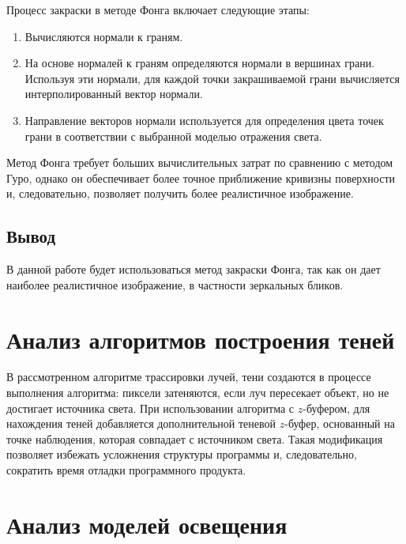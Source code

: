 Процесс закраски в методе Фонга включает следующие этапы:
\begin{enumerate}[label=\arabic*)]
	\item Вычисляются нормали к граням.
	\item На основе нормалей к граням определяются нормали в вершинах грани. Используя эти нормали, для каждой точки закрашиваемой грани вычисляется интерполированный вектор нормали.
	\item Направление векторов нормали используется для определения цвета точек грани в соответствии с выбранной моделью отражения света.
\end{enumerate}

Метод Фонга требует больших вычислительных затрат по сравнению с методом Гуро, однако он обеспечивает более точное приближение кривизны поверхности и, следовательно, позволяет получить более реалистичное изображение.

\subsection{Вывод}

В данной работе будет использоваться метод закраски Фонга, так как он дает наиболее реалистичное изображение, в частности зеркальных бликов.

\section{Анализ алгоритмов построения теней}

В рассмотренном алгоритме трассировки лучей, тени создаются в процессе выполнения алгоритма: пиксели затеняются, если луч пересекает объект, но не достигает источника света. 
При использовании алгоритма с $z$-буфером, для нахождения теней добавляется дополнительной теневой $z$-буфер, основанный на точке наблюдения, которая совпадает с источником света. Такая модификация позволяет избежать усложнения структуры программы и, следовательно, сократить время отладки программного продукта.

\section{Анализ моделей освещения}

